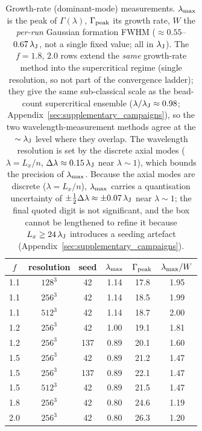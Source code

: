 \documentclass[usenatbib,twoside,twocolumn]{mnras}
\begin{document}
\begin{table}
\caption{Growth-rate (dominant-mode) measurements. $\lambda_{\rm max}$ is the peak of $\Gamma(\lambda)$, $\Gamma_{\rm peak}$ its growth rate, $W$ the \emph{per-run} Gaussian formation FWHM ($\approx0.55$--$0.67\,\lambda_{\rm J}$, not a single fixed value; all in $\lambda_{\rm J}$). The $f=1.8$, $2.0$ rows extend the \emph{same} growth-rate method into the supercritical regime (single resolution, so not part of the convergence ladder); they give the same sub-classical scale as the bead-count supercritical ensemble ($\lambda/\lambda_{\rm J}\approx0.98$; Appendix~\ref{sec:supplementary_campaigns}), so the two wavelength-measurement methods agree at the $\sim\lambda_{\rm J}$ level where they overlap. The wavelength resolution is set by the discrete axial modes ($\lambda=L_x/n$, $\Delta\lambda\approx0.15\,\lambda_{\rm J}$ near $\lambda\sim1$), which bounds the precision of $\lambda_{\rm max}$. Because the axial modes are discrete ($\lambda=L_x/n$), $\lambda_{\rm max}$ carries a quantisation uncertainty of $\pm\tfrac12\Delta\lambda\approx\pm0.07\,\lambda_{\rm J}$ near $\lambda\sim1$; the final quoted digit is not significant, and the box cannot be lengthened to refine it because $L_x\geq24\,\lambda_{\rm J}$ introduces a seeding artefact (Appendix~\ref{sec:supplementary_campaigns}).}
\label{tab:wave}
\footnotesize
\setlength{\tabcolsep}{4pt}
\begin{tabular}{cccccc}
\toprule
$f$ & resolution & seed & $\lambda_{\rm max}$ & $\Gamma_{\rm peak}$ & $\lambda_{\rm max}/W$ \\
\midrule
1.1 & $128^3$ & 42  & 1.14 & 17.8 & 1.95 \\
1.1 & $256^3$ & 42  & 1.14 & 18.5 & 1.99 \\
1.1 & $512^3$ & 42  & 1.14 & 18.7 & 2.00 \\
1.2 & $256^3$ & 42  & 1.00 & 19.1 & 1.81 \\
1.2 & $256^3$ & 137 & 0.89 & 20.1 & 1.60 \\
1.5 & $256^3$ & 42  & 0.89 & 21.2 & 1.47 \\
1.5 & $256^3$ & 137 & 0.89 & 22.1 & 1.47 \\
1.5 & $512^3$ & 42  & 0.89 & 21.5 & 1.47 \\
1.8 & $256^3$ & 42  & 0.80 & 24.6 & 1.19 \\
2.0 & $256^3$ & 42  & 0.80 & 26.3 & 1.20 \\
\bottomrule
\end{tabular}
\end{table}
\end{document}
